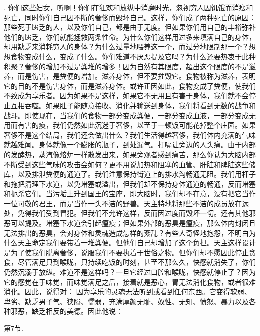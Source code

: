 .  你们这些妇女，听啊！你们在狂欢和放纵中消磨时光，忽视穷人因饥饿而消瘦和死亡，同时你们自己因不断的奢侈而毁坏自己。这样，你们成了两种死亡的原因：那些死于匮乏的人，以及你们自己，都是由于无度。但如果你们用自己的丰裕弥补他们的匮乏，你们就能拯救两条性命。为什么你们这样用过多来填满自己的身体，却用缺乏来消耗穷人的身体？为什么过量地喂养这一个，而过分地限制那一个？想想食物变成什么，变成了什么。你们难道不厌恶提及它吗？为什么还要热衷于此种积聚？奢侈的增加不过是粪堆的增多！因为自然有其限度，超出这个限度的不是滋养，而是伤害，是粪便的增加。滋养身体，但不要摧毁它。食物被称为滋养，表明它的目的不是伤害身体，而是滋养身体。或许正因如此，食物变成了粪便，使我们不致成为享乐者。因为如果不是这样，如果它不无用且有害于身体，我们就不会停止互相吞噬。如果肚子能随意接收、消化并输送到身体，我们将看到无数的战争和战斗。即使现在，当我们的食物一部分变成粪便，一部分变成血液，一部分变成无用而有害的痰，我们仍然如此沉迷于奢侈，以至于一顿饭可能花掉整个庄园。如果奢侈不是这个结局，我们还会做出什么？我们生活得越奢侈，我们体内充满的气味就越难闻。身体就像一个膨胀的瓶子，到处漏气。打嗝让旁边的人头痛。由于内部的发酵热，蒸汽像熔炉一样散发出来，如果旁观者感到痛苦，那么你认为大脑内部不断受到这些气味的攻击会如何？更不用说加热和阻塞的血管、肝脏和脾脏这些储库，以及排泄粪便的通道了。我们注意保持街道上的排水沟畅通无阻。我们用杆子和拖把清理下水道，以免堵塞或溢出，但我们却不保持身体通道的畅通，反而堵塞和扼杀它们。当污垢上升到国王的宝座，即大脑时，我们却不在意，没有把它当作一位可敬的君王，而是当作一头不洁的野兽。天主特地将那些不洁的成员放在远处，免得我们受到冒犯。但我们不允许这样，反而因过度而毁坏一切。还有其他邪恶可以提及。堵塞下水道会引起瘟疫；但如果外部的恶臭是瘟疫，那么体内封闭且无法排出的恶臭，会对身体和灵魂造成怎样的紊乱？有些人奇怪地抱怨，不明白为什么天主命定我们要带着一堆粪便。但他们自己却增加了这个负担。天主这样设计是为了使我们脱离奢侈，说服我们不要执着于世俗之物。但你们却不愿因此停止贪食，尽管满足只到喉咙，只持续吃饭的时刻，甚至不那么久，快感就消失了，你们仍然沉溺于放纵。难道不是这样吗？一旦它经过口腔和喉咙，快感就停止了？因为它的感觉在于味觉，而味觉满足之后，接着就是恶心，胃无法消化食物，或者很难消化。因此，说得对： 因为享乐的灵魂无法听到或看到任何东西。它变得软弱、卑劣、缺乏男子气、狭隘、懦弱，充满厚颜无耻、奴性、无知、愤怒、暴力以及各种邪恶，缺乏相反的美德。因此他说：\par

第7节. \par


